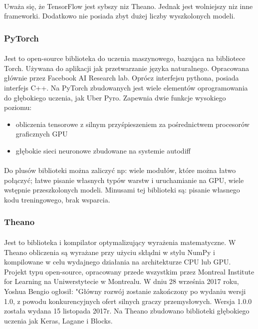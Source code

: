 \documentclass[a4paper,11pt]{article}
\begin{document}
\paragraph{}Uważa się, że TensorFlow jest sybszy niz Theano. Jednak jest wolniejszy niz inne frameworki. Dodatkowo nie posiada zbyt dużej liczby wyszkolonych modeli. 
\subsubsection{PyTorch}
\paragraph{}Jest to open-source biblioteka do uczenia maszynowego, bazująca na bibliotece Torch. Używana do aplikacji jak przetwarzanie języka naturalnego. Opracowana głównie przez Facebook AI Research lab. Oprócz interfejsu pythona, posiada interfejs C++. Na PyTorch zbudowanych jest wiele elementów oprogramowania do głębokiego uczenia, jak Uber Pyro. Zapewnia dwie funkcje wysokiego poziomu:
\begin{itemize}
\item obliczenia tensorowe z silnym przyśpieszeniem za pośrednictwem procesorów graficznych GPU
\item głębokie sieci neuronowe zbudowane na systemie autodiff
\end{itemize}
\paragraph{}Do plusów biblioteki można zaliczyć np: wiele modułów, które można łatwo połączyć; łatwe pisanie własnych typów warstw i uruchamianie na GPU, wiele wstępnie przeszkolonych modeli. Minusami tej biblioteki są: pisanie własnego kodu treningowego, brak wsparcia.
\subsubsection{Theano}
\paragraph{}Jest to biblioteka i kompilator optymalizujący wyrażenia matematyczne. W Theano obliczenia są wyrażane przy użyciu skłądni w stylu NumPy i kompilowane w celu wydajnego działania na architekturze CPU lub GPU. Projekt typu open-source, opracowany przede wszystkim przez Montreal Institute for Learning na Uniwerstytecie w Montrealu. W dniu 28 września 2017 roku, Yoshua Bengio ogłosił: "Główny rozwój zostanie zakończony po wydaniu wersji 1.0, z powodu konkurencyjnych ofert silnych graczy przemysłowych. Wersja 1.0.0 została wydana 15 listopada 2017r. Na Theano zbudowano biblioteki głębokiego uczenia jak Keras, Lagane i Blocks. 
\end{document}
